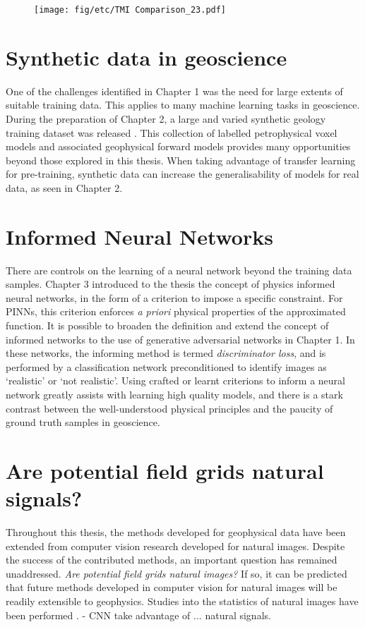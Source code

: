 \documentclass[manuscript.tex]{subfiles}
\begin{document}
\begin{figure}[hbt]
    \texttt{[image: fig/etc/TMI Comparison\_23.pdf]} %
    \caption{}
    \label{fig:rdncomp}
\end{figure}

\section{Synthetic data in geoscience}
One of the challenges identified in Chapter 1 was the need for large extents of suitable training data.
This applies to many machine learning tasks in geoscience.
During the preparation of Chapter 2, a large and varied synthetic geology training dataset was released \parencite{jessellNoddyverseMassiveData2022}.
This collection of labelled petrophysical voxel models and associated geophysical forward models provides many opportunities beyond those explored in this thesis.
When taking advantage of transfer learning for pre-training, synthetic data can increase the generalisability of models for real data, as seen in Chapter 2.


\section{Informed Neural Networks}
There are controls on the learning of a neural network beyond the training data samples.
Chapter 3 introduced to the thesis the concept of physics informed neural networks, in the form of a criterion to impose a specific constraint.
For PINNs, this criterion enforces \emph{a priori} physical properties of the approximated function.
It is possible to broaden the definition and extend the concept of informed networks to the use of generative adversarial networks in Chapter 1.
In these networks, the informing method is termed \emph{discriminator loss}, and is performed by a classification network preconditioned to identify images as `realistic' or `not realistic'.
Using crafted or learnt criterions to inform a neural network greatly assists with learning high quality models, and there is a stark contrast between the well-understood physical principles and the paucity of ground truth samples in geoscience.

\section{Are potential field grids natural signals?}
Throughout this thesis, the methods developed for geophysical data have been extended from computer vision research developed for natural images.
Despite the success of the contributed methods, an important question has remained unaddressed.
\emph{Are potential field grids natural images?}
If so, it can be predicted that future methods developed in computer vision for natural images will be readily extensible to geophysics.
Studies into the statistics of natural images have been performed \parencite{simoncelliNaturalImageStatistics2001,rudermanStatisticsNaturalImages1994,tolhurstAmplitudeSpectraNatural1992}.
\Textcite{lecunDeepLearning2015} - CNN take advantage of ... natural signals. 

\end{document}
